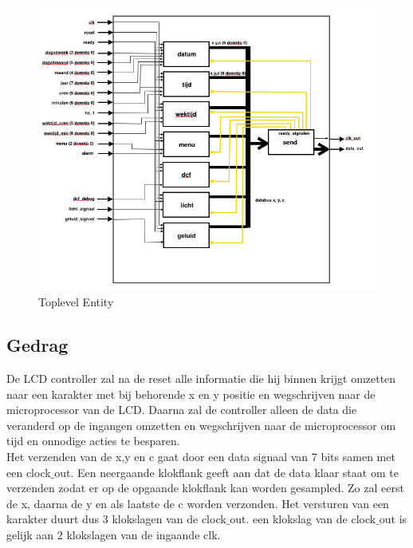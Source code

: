 \newpage
\begin{figure}
  \centering
     \includegraphics[angle = 0, scale= 0.75]{verslag_schemas/toplevel_entity.png}
       \caption{Toplevel Entity}
\label{fig:lcdtoplevel}
\end{figure}
\newpage

\subsection{Gedrag}
De LCD controller zal na de reset alle informatie die hij binnen krijgt omzetten naar een karakter met bij behorende x en y positie en wegschrijven naar de microprocessor van de LCD. Daarna zal de controller alleen de data die veranderd op de ingangen omzetten en  wegschrijven naar de microprocessor om tijd en onnodige acties te besparen. \\
Het verzenden van de x,y en c gaat door een data signaal van 7 bits samen met een clock$\_$out. Een neergaande klokflank geeft aan dat de data klaar staat om te verzenden zodat er op de opgaande klokflank kan worden gesampled. Zo zal eerst de x, daarna de y en als laatste de c worden verzonden. Het versturen van een karakter duurt dus 3 klokslagen van de clock$\_$out. een klokslag van de clock$\_$out is gelijk aan 2 klokslagen van de ingaande clk. 

